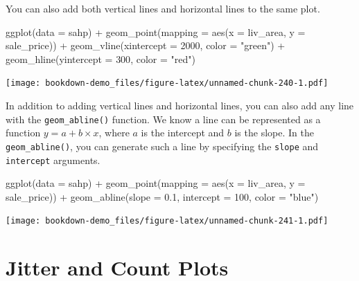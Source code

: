 \documentclass[
]{book}
\newenvironment{Shaded}{\begin{snugshade}}{\end{snugshade}}
\newcommand{\AttributeTok}[1]{\textcolor[rgb]{0.77,0.63,0.00}{#1}}
\newcommand{\DecValTok}[1]{\textcolor[rgb]{0.00,0.00,0.81}{#1}}
\newcommand{\FloatTok}[1]{\textcolor[rgb]{0.00,0.00,0.81}{#1}}
\newcommand{\FunctionTok}[1]{\textcolor[rgb]{0.00,0.00,0.00}{#1}}
\newcommand{\NormalTok}[1]{#1}
\newcommand{\SpecialCharTok}[1]{\textcolor[rgb]{0.00,0.00,0.00}{#1}}
\newcommand{\StringTok}[1]{\textcolor[rgb]{0.31,0.60,0.02}{#1}}
\begin{document}
You can also add both vertical lines and horizontal lines to the same plot.

\begin{Shaded}
\begin{Highlighting}[]
\FunctionTok{ggplot}\NormalTok{(}\AttributeTok{data =}\NormalTok{ sahp) }\SpecialCharTok{+} \FunctionTok{geom\_point}\NormalTok{(}\AttributeTok{mapping =} \FunctionTok{aes}\NormalTok{(}\AttributeTok{x =}\NormalTok{ liv\_area, }\AttributeTok{y =}\NormalTok{ sale\_price)) }\SpecialCharTok{+} \FunctionTok{geom\_vline}\NormalTok{(}\AttributeTok{xintercept =} \DecValTok{2000}\NormalTok{, }\AttributeTok{color =} \StringTok{"green"}\NormalTok{) }\SpecialCharTok{+} \FunctionTok{geom\_hline}\NormalTok{(}\AttributeTok{yintercept =} \DecValTok{300}\NormalTok{, }\AttributeTok{color =} \StringTok{"red"}\NormalTok{)}
\end{Highlighting}
\end{Shaded}

\texttt{[image: bookdown-demo\_files/figure-latex/unnamed-chunk-240-1.pdf]}

In addition to adding vertical lines and horizontal lines, you can also add any line with the \texttt{geom\_abline()} function. We know a line can be represented as a function \(y = a + b\times x\), where \(a\) is the intercept and \(b\) is the slope. In the \texttt{geom\_abline()}, you can generate such a line by specifying the \texttt{slope} and \texttt{intercept} arguments.

\begin{Shaded}
\begin{Highlighting}[]
\FunctionTok{ggplot}\NormalTok{(}\AttributeTok{data =}\NormalTok{ sahp) }\SpecialCharTok{+} \FunctionTok{geom\_point}\NormalTok{(}\AttributeTok{mapping =} \FunctionTok{aes}\NormalTok{(}\AttributeTok{x =}\NormalTok{ liv\_area, }\AttributeTok{y =}\NormalTok{ sale\_price)) }\SpecialCharTok{+} \FunctionTok{geom\_abline}\NormalTok{(}\AttributeTok{slope =} \FloatTok{0.1}\NormalTok{, }\AttributeTok{intercept =} \DecValTok{100}\NormalTok{, }\AttributeTok{color =} \StringTok{"blue"}\NormalTok{)}
\end{Highlighting}
\end{Shaded}

\texttt{[image: bookdown-demo\_files/figure-latex/unnamed-chunk-241-1.pdf]}

\hypertarget{jitter-count}{%
\section{Jitter and Count Plots}\label{jitter-count}}
\end{document}
